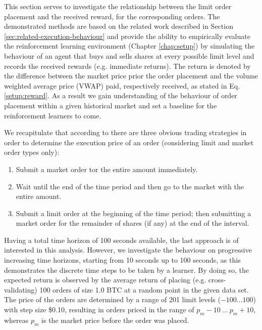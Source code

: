 This section serves to investigate the relationship between the limit order placement and the received reward, for the corresponding orders.
The demonstrated methods are based on the related work described in Section \ref{sec:related-execution-behaviour} and provide the ability to empirically evaluate the reinforcement learning environment (Chapter \ref{chap:setup}) by simulating the behaviour of an agent that buys and sells shares at every possible limit level and records the received rewards (e.g. immediate returns).
The return is denoted by the difference between the market price prior the order placement and the volume weighted average price (VWAP) paid, respectively received, as stated in Eq. \ref{setup:reward}.
As a result we gain understanding of the behaviour of order placement within a given historical market and set a baseline for the reinforcement learners to come.

We recapitulate that according to \cite{nevmyvaka2005electronic, yingsaeree2012algorithmic} there are three obvious trading strategies in order to determine the execution price of an order (considering limit and market order types only):
\begin{enumerate}
    \item Submit a market order tor the entire amount immediately.
    \item Wait until the end of the time period and then go to the market with the entire amount.
    \item Submit a limit order at the beginning of the time period; then submitting a market order for the remainder of shares (if any) at the end of the interval.
\end{enumerate}
Having a total time horizon of 100 seconds available, the last approach is of interested in this analysis.
However, we investigate the behaviour on progressive increasing time horizons, starting from 10 seconds up to 100 seconds, as this demonstrates the discrete time steps to be taken by a learner.
By doing so, the expected return is observed by the average return of placing (e.g. cross-validating) 100 orders of size 1.0 BTC at a random point in the given data set.
The price of the orders are determined by a range of 201 limit levels ($-100...100$) with step size \$0.10, resulting in orders priced in the range of $p_m-10 \ \dots \ p_m+10$, whereas $p_m$ is the market price before the order was placed.

